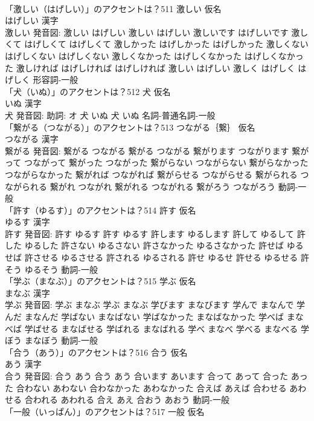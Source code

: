 \documentclass[8pt]{extreport}
\begin{document}
\begin{CJK}{UTF8}{min}
\\	「激しい（はげしい）」のアクセントは？511	激しい 仮名　
\\	はげしい 漢字　
\\	激しい 発音図:	激しい はげしい		激しい はげしい 激しいです はげしいです 激しくて はげしくて はげしくて 激しかった はげしかった はげしかった 激しくない はげしくない はげしくない 激しくなかった はげしくなかった はげしくなかった 激しければ はげしければ はげしければ 激しい はげしい 激しく はげしく はげしく				形容詞-一般 
\\	「犬（いぬ）」のアクセントは？512	犬 仮名　
\\	いぬ 漢字　
\\	犬 発音図: 助詞: オ	犬 いぬ		犬 いぬ				名詞-普通名詞-一般 
\\	「繋がる（つながる）」のアクセントは？513	つながる｛繋｝ 仮名　
\\	つながる 漢字　
\\	繋がる 発音図:	繋がる つながる		繋がる つながる 繋がります つながります 繋がって つながって 繋がった つながった 繋がらない つながらない 繋がらなかった つながらなかった 繋がれば つながれば 繋がらせる つながらせる 繋がられる つながられる 繋がれ つながれ 繋がれる つながれる 繋がろう つながろう				動詞-一般 
\\	「許す（ゆるす）」のアクセントは？514	許す 仮名　
\\	ゆるす 漢字　
\\	許す 発音図:	許す ゆるす		許す ゆるす 許します ゆるします 許して ゆるして 許した ゆるした 許さない ゆるさない 許さなかった ゆるさなかった 許せば ゆるせば 許させる ゆるさせる 許される ゆるされる 許せ ゆるせ 許せる ゆるせる 許そう ゆるそう				動詞-一般 
\\	「学ぶ（まなぶ）」のアクセントは？515	学ぶ 仮名　
\\	まなぶ 漢字　
\\	学ぶ 発音図:	学ぶ まなぶ		学ぶ まなぶ 学びます まなびます 学んで まなんで 学んだ まなんだ 学ばない まなばない 学ばなかった まなばなかった 学べば まなべば 学ばせる まなばせる 学ばれる まなばれる 学べ まなべ 学べる まなべる 学ぼう まなぼう				動詞-一般 
\\	「合う（あう）」のアクセントは？516	合う 仮名　
\\	あう 漢字　
\\	合う 発音図:	合う あう		合う あう 合います あいます 合って あって 合った あった 合わない あわない 合わなかった あわなかった 合えば あえば 合わせる あわせる 合われる あわれる 合え あえ 合おう あおう				動詞-一般 
\\	「一般（いっぱん）」のアクセントは？517	一般 仮名　

\end{CJK}
\end{document}
